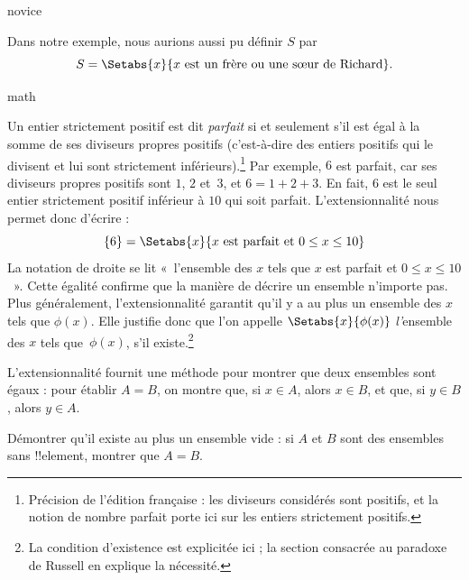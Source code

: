 \documentclass[../../../include/open-logic-section]{subfiles}
\begin{document}
\begin{tagblock}{novice}
\begin{ex}
Dans notre exemple, nous aurions aussi pu définir $S$ par
\[
S = \Setabs{x}{x \text{ est un frère ou une sœur de Richard}}.
\]
\end{ex}
\end{tagblock}

\begin{tagblock}{math}
\begin{ex}
Un entier strictement positif est dit \emph{parfait} si et seulement
s'il est égal à la somme de ses diviseurs propres positifs
(c'est-à-dire des entiers positifs qui le divisent et lui sont
strictement inférieurs).\footnote{Précision de l'édition française :
les diviseurs considérés sont positifs, et la notion de nombre parfait
porte ici sur les entiers strictement positifs.}
Par exemple, $6$ est parfait, car ses diviseurs propres positifs
sont $1$, $2$ et~$3$, et $6 = 1 + 2 + 3$. En fait, $6$ est le seul
entier strictement positif inférieur à $10$ qui soit parfait.
L'extensionnalité nous permet donc d'écrire :
\[
	\{6\} = \Setabs{x}{x\text{ est parfait et }0 \leq x \leq 10}
\]
La notation de droite se lit «~l'ensemble des $x$ tels que $x$
est parfait et $0 \leq x \leq 10$~». Cette égalité confirme que
la manière de décrire un ensemble n'importe pas. Plus généralement,
l'extensionnalité garantit qu'il y a au plus un ensemble des $x$
tels que $\phi(x)$. Elle justifie donc que l'on appelle
$\Setabs{x}{\phi(x)}$ \emph{l'}ensemble des $x$ tels que~$\phi(x)$,
s'il existe.\footnote{La condition d'existence est explicitée ici ;
la section consacrée au paradoxe de Russell en explique la nécessité.}
\end{ex}
\end{tagblock}

L'extensionnalité fournit une méthode pour montrer que deux ensembles
sont égaux : pour établir $A = B$, on montre que, si $x \in A$,
alors $x \in B$, et que, si $y \in B$, alors $y \in A$.

\begin{prob}
Démontrer qu'il existe au plus un ensemble vide : si $A$ et $B$ sont
des ensembles sans !!{element}, montrer que $A = B$.
\end{prob}
\end{document}
